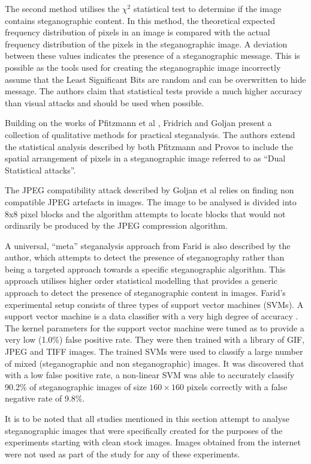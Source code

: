 \par The second method utilises the $\chi^{2}$ statistical test to determine if the image contains steganographic content. In this method,  the theoretical expected frequency distribution of pixels in an image is compared with the actual frequency distribution of the pixels in the steganographic image. A deviation between these values indicates the presence of a steganographic message. This is possible as the tools used for creating the steganographic image incorrectly assume that the Least Significant Bits are random and can be overwritten to hide message. The authors claim that statistical tests provide a much higher accuracy than visual attacks and should be used when possible. 
\par Building on the works of Pfitzmann et al  \cite{westfeld2000attacks}, Fridrich and Goljan \cite{fridrich2002practical} present a collection of qualitative methods for practical steganalysis. The authors extend the statistical analysis described by both Pfitzmann and Provos to include the spatial arrangement of pixels in a steganographic image referred to as ``Dual Statistical attacks''.  
\par The JPEG compatibility attack described by Goljan et al relies on finding non compatible JPEG artefacts in images. The image to be analysed is divided into  8x8 pixel blocks and the algorithm attempts to locate blocks that would not ordinarily be produced by the JPEG compression algorithm.
\par A universal, ``meta'' steganalysis approach from Farid  \cite{farid2002detecting} is also described by the author, which attempts to detect the presence of steganography rather than being a targeted approach towards a specific steganographic algorithm.  This approach utilises higher order statistical modelling that provides a generic approach to detect the presence of steganographic content in images. Farid's experimental setup consists of three types of support vector machines (SVMs). A support vector machine is a data classifier with a very high degree of accuracy \cite{noble2006support}. The kernel parameters for the support vector machine were tuned as to provide a very low (1.0\%) false positive rate. They were then trained with a library of GIF, JPEG and TIFF images. The trained SVMs were used to classify a large number of mixed (steganographic and non steganographic) images. It was discovered that with a low false positive rate, a non-linear SVM was able to accurately classify 90.2\% of steganographic images of size $160\times160$ pixels correctly with a false negative rate of 9.8\%.
\par It is to be noted that all studies mentioned in this section attempt to analyse steganographic images that were specifically created for the purposes of the experiments starting with clean stock images. Images obtained from the internet were not used as part of the study for any of these experiments.

